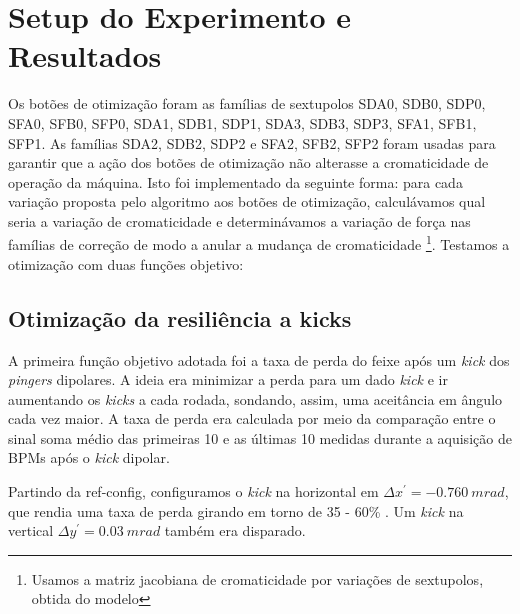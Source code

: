 \documentclass[a4paper,
               keeplastbox,   %
               ]{jacow}
\begin{document}
\section{Setup do Experimento e Resultados}
Os botões de otimização foram as famílias de sextupolos SDA0, SDB0, SDP0, SFA0, SFB0, SFP0, SDA1, SDB1, SDP1, SDA3, SDB3, SDP3, SFA1, SFB1, SFP1. As famílias SDA2, SDB2, SDP2 e SFA2, SFB2, SFP2 foram usadas para garantir que a ação dos botões de otimização não alterasse a cromaticidade de operação da máquina. Isto foi implementado da seguinte forma: para cada variação proposta pelo algoritmo aos botões de otimização, calculávamos qual seria a variação de cromaticidade e determinávamos a variação de força nas famílias de correção de modo a anular a mudança de cromaticidade \footnote{Usamos a matriz jacobiana de cromaticidade por variações de sextupolos, obtida do modelo}. 
Testamos a otimização com duas funções objetivo:
\subsection{Otimização da resiliência a kicks}
A primeira função objetivo adotada foi a taxa de perda do feixe após um \textit{kick} dos \textit{pingers} dipolares. A ideia era minimizar a perda para um dado \textit{kick} e ir aumentando os \textit{kicks} a cada rodada, sondando, assim, uma aceitância em ângulo cada vez maior. %
A taxa de perda era calculada por meio da comparação entre o sinal soma médio das primeiras 10 e as últimas 10 medidas durante a aquisição de BPMs após o \textit{kick} dipolar.

Partindo da ref-config, configuramos o \textit{kick} na horizontal em $\Delta x^\prime = -0.760~ \unit{m rad}$, que rendia uma taxa de perda girando em torno de 35 - 60\% . Um \textit{kick} na vertical $\Delta y^\prime = 0.03~\unit{m rad}$ também era disparado.
\end{document}

